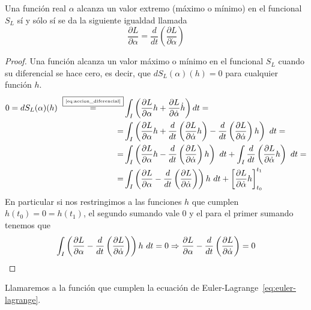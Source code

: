 \begin{theorem}
	Una función real $\alpha$ alcanza un valor extremo (máximo o mínimo) en el funcional $S_L$ sí y sólo sí se da la siguiente igualdad llamada 
	\begin{equation}
		\label{eq:euler-lagrange}
		\frac{\partial L}{\partial \alpha}=\frac{d}{dt}\left( \frac{\partial L}{\partial \dot{\alpha}} \right)
	\end{equation}
\end{theorem}
\begin{proof}
	Una función alcanza un valor máximo o mínimo en el funcional $S_L$ cuando su diferencial se hace cero, es decir, que $dS_L(\alpha)(h)=0$ para cualquier función $h$.
	\begin{equation*}
		\begin{split}
			0 = dS_L(\alpha)(h)~\overset{\fbox{\tiny \ref{eq:accion_diferencial}}}{=}&\int_{I}\left( \frac{\partial L}{\partial\alpha}h+\frac{\partial L}{\partial\dot{\alpha}}\dot{h}\right) dt =\\
			= & \int_{I}\left( \frac{\partial L}{\partial\alpha}h+\frac{d}{dt}\left( \frac{\partial L}{\partial \dot{\alpha}}h \right)-\frac{d}{dt}\left( \frac{\partial L}{\partial \dot{\alpha}} \right)h\right)\ dt = \\
			= & \int_{I}\left( \frac{\partial L}{\partial \alpha}h-\frac{d}{dt}\left( \frac{\partial L}{\partial \dot{\alpha}} \right)h\right)\ dt +\int_{I}\frac{d}{dt}\left( \frac{\partial L}{\partial \dot{\alpha}}h \right)\ dt = \\
			= & \int_I\left( \frac{\partial L}{\partial \alpha}-\frac{d}{dt}\left( \frac{\partial L}{\partial \dot{\alpha}} \right)\right)h\ dt + \left[ \frac{\partial L}{\partial \dot{\alpha}}h \right]_{t_0}^{t_1}
		\end{split}
	\end{equation*}
	En particular si nos restringimos a las funciones $h$ que cumplen $h(t_0)=0=h(t_1)$, el segundo sumando vale $0$ y el para el primer sumando tenemos que
	\begin{equation*}
		\int_{I}\left( \frac{\partial L}{\partial \alpha}-\frac{d}{dt}\left( \frac{\partial L}{\partial \dot{\alpha}} \right)\right)h\ dt = 0 \Rightarrow \frac{\partial L}{\partial \alpha}-\frac{d}{dt}\left( \frac{\partial L}{\partial \dot{\alpha}} \right) = 0
	\end{equation*}
\end{proof}

\begin{definition}
	Llamaremos   a la función que cumplen la ecuación de Euler-Lagrange~\eqref{eq:euler-lagrange}.
\end{definition}

